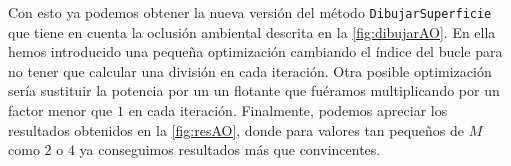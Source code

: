 Con esto ya podemos obtener la nueva versión del método \texttt{DibujarSuperficie} que tiene en cuenta la oclusión ambiental descrita en la \autoref{fig:dibujarAO}. En ella hemos introducido una pequeña optimización \cite{ao_opt} cambiando el índice del bucle para no tener que calcular una división en cada iteración. Otra posible optimización sería sustituir la potencia por un un flotante que fuéramos multiplicando por un factor menor que $1$ en cada iteración. Finalmente, podemos apreciar los resultados obtenidos en la \autoref{fig:resAO}, donde para valores tan pequeños de $M$ como $2$ o $4$ ya conseguimos resultados más que convincentes.


